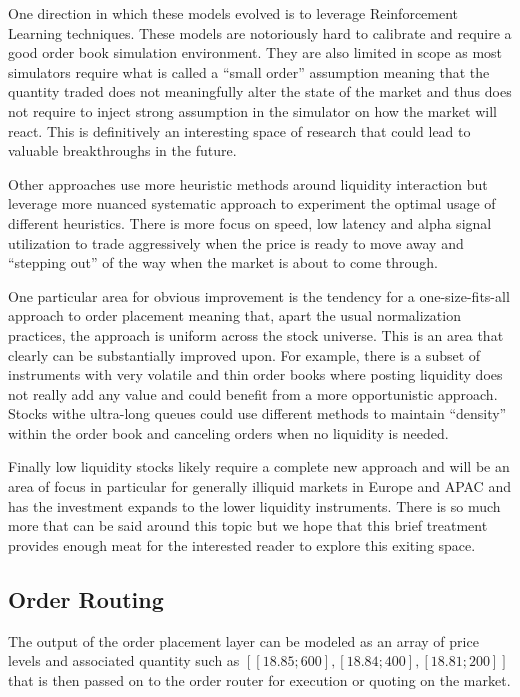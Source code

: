 One direction in which these models evolved is to leverage Reinforcement Learning techniques. These models are notoriously hard to calibrate and require a good order book simulation environment. They are also limited in scope as most simulators require what is called a ``small order'' assumption meaning that the quantity traded does not meaningfully alter the state of the market and thus does not require to inject strong assumption in the simulator on how the market will react. This is definitively an interesting space of research that could lead to valuable breakthroughs in the future.


Other approaches use more heuristic methods around liquidity interaction but leverage more nuanced systematic approach to experiment the optimal usage of different heuristics. There is more focus on speed, low latency and alpha signal utilization to trade aggressively when the price is ready to move away and ``stepping out'' of the way when the market is about to come through.


One particular area for obvious improvement is the tendency for a one-size-fits-all approach to order placement meaning that, apart the usual normalization practices, the approach is uniform across the stock universe. This is an area that clearly can be substantially improved upon. For example, there is a subset of instruments with very volatile and thin order books where posting liquidity does not really add any value and could benefit from a more opportunistic approach. Stocks withe ultra-long queues could use different methods to maintain ``density'' within the order book and canceling orders when no liquidity is needed.


Finally low liquidity stocks likely require a complete new approach and will be an area of focus in particular for generally illiquid markets in Europe and APAC and has the investment expands to the lower liquidity instruments. There is so much more that can be said around this topic but we hope that this brief treatment provides enough meat for the interested reader to explore this exiting space.



\subsection{Order Routing}

The output of the order placement layer can be modeled as an array of price levels and associated quantity such as $[ [18.85 ; 600], [18.84 ; 400], [18.81 ; 200] ]$ that is then passed on to the order router for execution or quoting on the market.


